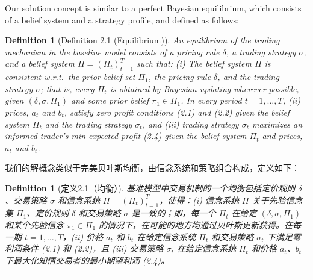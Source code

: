 \documentclass[12pt,a4paper]{article}
\newenvironment{original}{%
  \par\vspace{4pt}\noindent%
  \color{black}%
  \ignorespaces
}{%
  \par\vspace{2pt}%
}
\newenvironment{translation}{%
  \par\vspace{2pt}\noindent%
  \color{transblue}%
  \ignorespaces
}{%
  \par\vspace{4pt}\hrule\vspace{6pt}%
}
\newtheorem{definition}[theorem]{Definition}
\begin{document}
\begin{original}
Our solution concept is similar to a perfect Bayesian equilibrium, which consists of a belief system and a strategy profile, and defined as follows:

\begin{definition}[Definition 2.1 (Equilibrium)]
An equilibrium of the trading mechanism in the baseline model consists of a pricing rule $\delta$, a trading strategy $\sigma$, and a belief system $\Pi = (\Pi_t)_{t=1}^{T}$ such that: (i) The belief system $\Pi$ is consistent w.r.t.\ the prior belief set $\Pi_1$, the pricing rule $\delta$, and the trading strategy $\sigma$; that is, every $\Pi_t$ is obtained by Bayesian updating wherever possible, given $(\delta, \sigma, \Pi_1)$ and some prior belief $\pi_1 \in \Pi_1$. In every period $t = 1, \ldots, T$, (ii) prices, $a_t$ and $b_t$, satisfy zero profit conditions (2.1) and (2.2) given the belief system $\Pi_t$ and the trading strategy $\sigma_t$, and (iii) trading strategy $\sigma_t$ maximizes an informed trader's min-expected profit (2.4) given the belief system $\Pi_t$ and prices, $a_t$ and $b_t$.
\end{definition}
\end{original}
\begin{translation}
我们的解概念类似于完美贝叶斯均衡，由信念系统和策略组合构成，定义如下：

\begin{definition}[定义2.1（均衡）]
基准模型中交易机制的一个均衡包括定价规则 $\delta$、交易策略 $\sigma$ 和信念系统 $\Pi = (\Pi_t)_{t=1}^{T}$，使得：(i) 信念系统 $\Pi$ 关于先验信念集 $\Pi_1$、定价规则 $\delta$ 和交易策略 $\sigma$ 是一致的；即，每一个 $\Pi_t$ 在给定 $(\delta, \sigma, \Pi_1)$ 和某个先验信念 $\pi_1 \in \Pi_1$ 的情况下，在可能的地方均通过贝叶斯更新获得。在每一期 $t = 1, \ldots, T$，(ii) 价格 $a_t$ 和 $b_t$ 在给定信念系统 $\Pi_t$ 和交易策略 $\sigma_t$ 下满足零利润条件 (2.1) 和 (2.2)，且 (iii) 交易策略 $\sigma_t$ 在给定信念系统 $\Pi_t$ 和价格 $a_t$、$b_t$ 下最大化知情交易者的最小期望利润 (2.4)。
\end{definition}
\end{translation}
\end{document}
